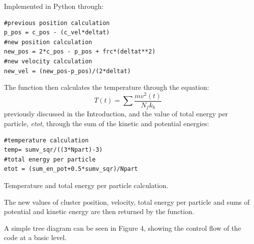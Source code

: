 \documentclass{article}
\begin{document}
\begin{multicols}{2}
\begin{flushleft}
Implemented in Python through:	
\end{flushleft}	


\captionsetup[lstlisting]{position=bottom,font=footnotesize}
\renewcommand{\lstlistingname}{Code}
\begin{lstlisting}
#previous position calculation
p_pos = c_pos - (c_vel*deltat)
#new position calculation
new_pos = 2*c_pos - p_pos + frc*(deltat**2)
#new velocity calculation
new_vel = (new_pos-p_pos)/(2*deltat)
\end{lstlisting}

The function then calculates the temperature through the equation:
\[T(t) = \sum \frac{mv^{2}(t)}{N_f k_b}\]
previously discussed in the Introduction, and the value of total energy per particle, \textit{etot}, through the sum of the kinetic and potential energies:

\captionsetup[lstlisting]{position=bottom,font=footnotesize}
\renewcommand{\lstlistingname}{Code}
\begin{lstlisting}
#temperature calculation
temp= sumv_sqr/((3*Npart)-3)
#total energy per particle
etot = (sum_en_pot+0.5*sumv_sqr)/Npart
\end{lstlisting}
\setlength{\belowcaptionskip}{3pt plus 3pt minus 2pt}
\caption{Temperature and total energy per particle calculation.}

The new values of cluster position, velocity, total energy per particle and sums of potential and kinetic energy are then returned by the function.

	A simple tree diagram can be seen in Figure 4, showing the control flow of the code at a basic level. 
	\renewcommand{\lstlistingname}{Figure}
	\setlength{\belowcaptionskip}{10pt plus 3pt minus 2pt}
	\captionsetup{font=footnotesize,singlelinecheck=on}


\end{multicols}
\end{document}
